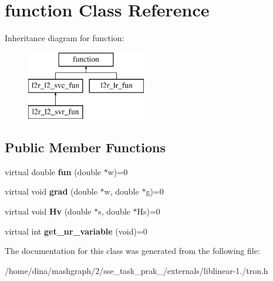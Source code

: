 \hypertarget{classfunction}{\section{function Class Reference}
\label{classfunction}
}
Inheritance diagram for function\-:\begin{figure}[H]
\begin{center}
\leavevmode
\includegraphics[height=3.000000cm]{classfunction}
\end{center}
\end{figure}
\subsection*{Public Member Functions}
\begin{DoxyCompactItemize}
\item 
\hypertarget{classfunction_ab9714768de2d088ac96d92548fbd1d57}{virtual double {\bfseries fun} (double $\ast$w)=0}\label{classfunction_ab9714768de2d088ac96d92548fbd1d57}

\item 
\hypertarget{classfunction_a9945a14b6828ab3142e7e038c39c3c0a}{virtual void {\bfseries grad} (double $\ast$w, double $\ast$g)=0}\label{classfunction_a9945a14b6828ab3142e7e038c39c3c0a}

\item 
\hypertarget{classfunction_ad5c45edb5db0514ca078c46dedf1394c}{virtual void {\bfseries Hv} (double $\ast$s, double $\ast$Hs)=0}\label{classfunction_ad5c45edb5db0514ca078c46dedf1394c}

\item 
\hypertarget{classfunction_a6b051777fb0c93c83ebefba1669c44ae}{virtual int {\bfseries get\-\_\-nr\-\_\-variable} (void)=0}\label{classfunction_a6b051777fb0c93c83ebefba1669c44ae}

\end{DoxyCompactItemize}


The documentation for this class was generated from the following file\-:\begin{DoxyCompactItemize}
\item 
/home/dina/mashgraph/2/sse\-\_\-task\-\_\-prak\-\_/externals/liblinear-\/1./tron.\-h\end{DoxyCompactItemize}
